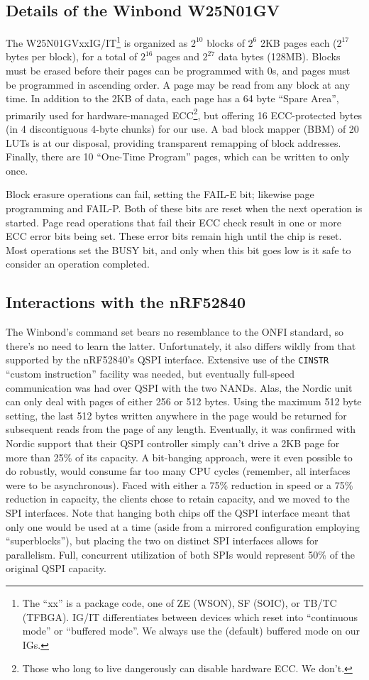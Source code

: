 \documentclass[letterpaper,10pt]{article}
\begin{document}
\subsection{Details of the Winbond W25N01GV}
The W25N01GVxxIG/IT\footnote{The ``xx'' is a package code, one of ZE (WSON), SF (SOIC),
or TB/TC (TFBGA). IG/IT differentiates between devices which reset into ``continuous mode''
or ``buffered mode''. We always use the (default) buffered mode on our IGs.} is
organized as $2^{10}$ blocks of $2^6$ 2KB pages each ($2^{17}$ bytes per block), for
a total of $2^{16}$ pages and $2^{27}$ data bytes (128MB). Blocks must be
erased before their pages can be programmed with 0s, and pages must be
programmed in ascending order. A page may be read from any block at any time.
In addition to the 2KB of data, each page has a 64 byte ``Spare Area'',
primarily used for hardware-managed ECC\footnote{Those who long to live
dangerously can disable hardware ECC. We don't.}, but offering 16 ECC-protected bytes
(in 4 discontiguous 4-byte chunks) for our use. A bad block mapper (BBM) of 20
LUTs is at our disposal, providing transparent remapping of block addresses.
Finally, there are 10 ``One-Time Program'' pages, which can be written to only
once.

Block erasure operations can fail, setting the FAIL-E bit; likewise page
programming and FAIL-P. Both of these bits are reset when the next operation
is started. Page read operations that fail their ECC check result in one or
more ECC error bits being set. These error bits remain high until the chip is
reset. Most operations set the BUSY bit, and only when this bit goes low is it
safe to consider an operation completed.

\subsection{Interactions with the nRF52840}
The Winbond's command set bears no resemblance to the ONFI
standard\parencite{onfi}, so there's no need to learn the latter. Unfortunately,
it also differs wildly from that supported by the nRF52840's QSPI
interface. Extensive use of the {\texttt{CINSTR}} ``custom instruction''
facility was needed, but eventually full-speed communication was had over
QSPI with the two NANDs. Alas, the Nordic unit can only deal with pages of
either 256 or 512 bytes. Using the maximum 512 byte setting, the last 512 bytes
written anywhere in the page would be returned for subsequent reads from the
page of any length. Eventually, it was confirmed with Nordic support that their
QSPI controller simply can't drive a 2KB page for more than 25\% of its
capacity. A bit-banging approach, were it even possible to do robustly,
would consume far too many CPU cycles (remember, all interfaces were to be
asynchronous). Faced with either a 75\% reduction in speed or a 75\% reduction
in capacity, the clients chose to retain capacity, and we moved to the SPI interfaces.
Note that hanging both chips off the QSPI interface meant that only one would
be used at a time (aside from a mirrored configuration employing
``superblocks''\parencite{superblocks}), but placing the two on distinct SPI
interfaces allows for parallelism. Full, concurrent utilization of both SPIs would represent
50\% of the original QSPI capacity.
\end{document}
